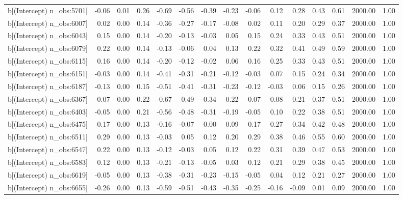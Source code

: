 \begin{table}[ht]
\begin{tabular}{rrrrrrrrrrrrrrr}
  b[(Intercept) n\_obs:5701] & -0.06 & 0.01 & 0.26 & -0.69 & -0.56 & -0.39 & -0.23 & -0.06 & 0.12 & 0.28 & 0.43 & 0.61 & 2000.00 & 1.00 \\ 
  b[(Intercept) n\_obs:6007] & 0.02 & 0.00 & 0.14 & -0.36 & -0.27 & -0.17 & -0.08 & 0.02 & 0.11 & 0.20 & 0.29 & 0.37 & 2000.00 & 1.00 \\ 
  b[(Intercept) n\_obs:6043] & 0.15 & 0.00 & 0.14 & -0.20 & -0.13 & -0.03 & 0.05 & 0.15 & 0.24 & 0.33 & 0.43 & 0.51 & 2000.00 & 1.00 \\ 
  b[(Intercept) n\_obs:6079] & 0.22 & 0.00 & 0.14 & -0.13 & -0.06 & 0.04 & 0.13 & 0.22 & 0.32 & 0.41 & 0.49 & 0.59 & 2000.00 & 1.00 \\ 
  b[(Intercept) n\_obs:6115] & 0.16 & 0.00 & 0.14 & -0.20 & -0.12 & -0.02 & 0.06 & 0.16 & 0.25 & 0.33 & 0.43 & 0.51 & 2000.00 & 1.00 \\ 
  b[(Intercept) n\_obs:6151] & -0.03 & 0.00 & 0.14 & -0.41 & -0.31 & -0.21 & -0.12 & -0.03 & 0.07 & 0.15 & 0.24 & 0.34 & 2000.00 & 1.00 \\ 
  b[(Intercept) n\_obs:6187] & -0.13 & 0.00 & 0.15 & -0.51 & -0.41 & -0.31 & -0.23 & -0.12 & -0.03 & 0.06 & 0.15 & 0.26 & 2000.00 & 1.00 \\ 
  b[(Intercept) n\_obs:6367] & -0.07 & 0.00 & 0.22 & -0.67 & -0.49 & -0.34 & -0.22 & -0.07 & 0.08 & 0.21 & 0.37 & 0.51 & 2000.00 & 1.00 \\ 
  b[(Intercept) n\_obs:6403] & -0.05 & 0.00 & 0.21 & -0.56 & -0.48 & -0.31 & -0.19 & -0.05 & 0.10 & 0.22 & 0.38 & 0.51 & 2000.00 & 1.00 \\ 
  b[(Intercept) n\_obs:6475] & 0.17 & 0.00 & 0.13 & -0.16 & -0.07 & 0.00 & 0.09 & 0.17 & 0.27 & 0.34 & 0.42 & 0.48 & 2000.00 & 1.00 \\ 
  b[(Intercept) n\_obs:6511] & 0.29 & 0.00 & 0.13 & -0.03 & 0.05 & 0.12 & 0.20 & 0.29 & 0.38 & 0.46 & 0.55 & 0.60 & 2000.00 & 1.00 \\ 
  b[(Intercept) n\_obs:6547] & 0.22 & 0.00 & 0.13 & -0.12 & -0.03 & 0.05 & 0.12 & 0.22 & 0.31 & 0.39 & 0.47 & 0.53 & 2000.00 & 1.00 \\ 
  b[(Intercept) n\_obs:6583] & 0.12 & 0.00 & 0.13 & -0.21 & -0.13 & -0.05 & 0.03 & 0.12 & 0.21 & 0.29 & 0.38 & 0.45 & 2000.00 & 1.00 \\ 
  b[(Intercept) n\_obs:6619] & -0.05 & 0.00 & 0.13 & -0.38 & -0.31 & -0.23 & -0.15 & -0.05 & 0.04 & 0.12 & 0.21 & 0.27 & 2000.00 & 1.00 \\ 
  b[(Intercept) n\_obs:6655] & -0.26 & 0.00 & 0.13 & -0.59 & -0.51 & -0.43 & -0.35 & -0.25 & -0.16 & -0.09 & 0.01 & 0.09 & 2000.00 & 1.00 \\ 

\end{tabular}
\end{table}

